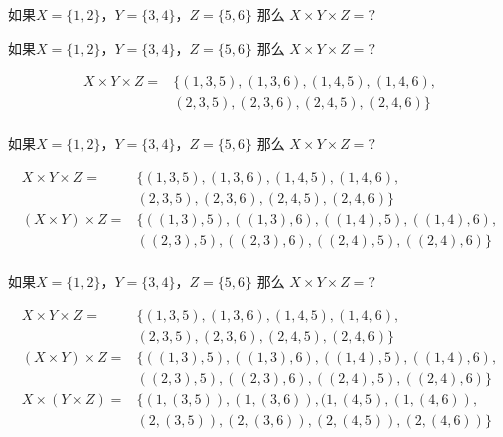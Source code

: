 \documentclass{beamer}
\begin{document}
\begin{CJK*}{UTF8}{gbsn}
\begin{frame}
\end{frame}
\begin{frame}
  \begin{Ex}
    如果$X=\{1,2\}$，$Y=\{3,4\}$，$Z=\{5,6\}$ 那么 $X \times Y \times Z = ?$
  \end{Ex}
\end{frame}
\begin{frame}
  \begin{Ex}
    如果$X=\{1,2\}$，$Y=\{3,4\}$，$Z=\{5,6\}$ 那么 $X \times Y \times Z = ?$
  \end{Ex}
  \begin{align*}
    X \times Y \times Z =& \{ (1,3, 5), (1,3, 6), (1, 4, 5), (1, 4, 6), \\
&(2, 3, 5), (2, 3, 6), (2, 4, 5), (2, 4, 6) \}\\
  \end{align*}
\end{frame}
\begin{frame}
  \begin{Ex}
    如果$X=\{1,2\}$，$Y=\{3,4\}$，$Z=\{5,6\}$ 那么 $X \times Y \times Z = ?$
  \end{Ex}
  \begin{align*}
    X \times Y \times Z =& \{ (1,3, 5), (1,3, 6), (1, 4, 5), (1, 4, 6), \\
&(2, 3, 5), (2, 3, 6), (2, 4, 5), (2, 4, 6) \}\\
(X \times Y) \times Z =& \{ ((1,3), 5), ((1,3), 6), ((1, 4), 5), ((1, 4), 6), \\
&((2, 3), 5), ((2, 3), 6), ((2, 4), 5), ((2, 4), 6) \}\\
  \end{align*}
\end{frame}
\begin{frame}
  \begin{Ex}
    如果$X=\{1,2\}$，$Y=\{3,4\}$，$Z=\{5,6\}$ 那么 $X \times Y \times Z = ?$
  \end{Ex}
  \begin{align*}
    X \times Y \times Z =& \{ (1,3, 5), (1,3, 6), (1, 4, 5), (1, 4, 6), \\
&(2, 3, 5), (2, 3, 6), (2, 4, 5), (2, 4, 6) \}\\
(X \times Y) \times Z =& \{ ((1,3), 5), ((1,3), 6), ((1, 4), 5), ((1, 4), 6), \\
&((2, 3), 5), ((2, 3), 6), ((2, 4), 5), ((2, 4), 6) \}\\
X \times (Y \times Z) =& \{ (1,(3, 5)), (1,(3, 6)), (1, (4, 5), (1, (4, 6)), \\
&(2, (3, 5)), (2, (3, 6)), (2, (4, 5)), (2,( 4, 6)) \}\\
  \end{align*}
\end{frame}

\end{CJK*}
\end{document}
